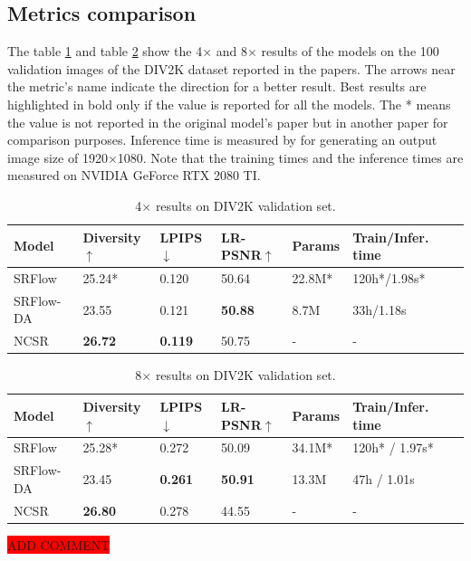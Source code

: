 \documentclass{article}
\begin{document}
\subsection{Metrics comparison}
The table \ref{tab:4x} and table \ref{tab:8x} show the 4$\times$ and 8$\times$ results of the models on the 100 validation
images of the DIV2K dataset reported in the papers. The arrows near the metric's name indicate the direction for a better result. Best results are highlighted in bold only if the value is reported for all the models. The * means the value is not reported in the original model's paper but in another paper for comparison purposes. Inference time is measured by \cite{srFlow-da} for generating an output image size of 1920$\times$1080. Note that the training times and the inference times are measured on NVIDIA GeForce RTX 2080 TI. 

\begin{table}[h]
    \centering
    \begin{tabular}{ l l l l l l l }
    \hline
    Model & Diversity$\uparrow$ & LPIPS$\downarrow$ & LR-PSNR$\uparrow$ & Params & Train/Infer. time \\
    \hline
    SRFlow      & 25.24* & 0.120 & 50.64 & 22.8M* & 120h*/1.98s*\\
    SRFlow-DA   & 23.55 & 0.121  & \textbf{50.88} & 8.7M  & 33h/1.18s\\
    NCSR        & \textbf{26.72} & \textbf{0.119}  & 50.75 & - & - \\
    \hline
    \end{tabular}
    \caption{4$\times$ results on DIV2K validation set. }
    \label{tab:4x}
\end{table}

\begin{table}[h]
    \centering
    \begin{tabular}{ l l l l l l l }
    \hline
    Model & Diversity$\uparrow$ & LPIPS$\downarrow$ & LR-PSNR$\uparrow$ & Params & Train/Infer. time \\
    \hline
    SRFlow      & 25.28* & 0.272 &  50.09 & 34.1M* & 120h* / 1.97s*\\
    SRFlow-DA   & 23.45 & \textbf{0.261}  & \textbf{50.91} & 13.3M  & 47h / 1.01s\\
    NCSR        & \textbf{26.80} & 0.278  & 44.55 & - & - \\
    \hline
    \end{tabular}
    \caption{8$\times$ results on DIV2K validation set. }
    \label{tab:8x}
\end{table}
\colorbox{red}{ADD COMMENT}
\end{document}
